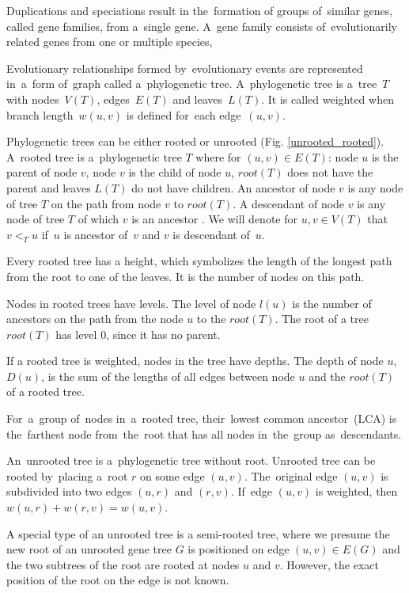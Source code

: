 Duplications and speciations result in the~formation of groups of~similar genes, called gene families, from a~single gene. A~gene family consists of~evolutionarily related genes from one or multiple species, 

Evolutionary relationships formed by~evolutionary events are represented in~a~form of~graph called a~phylogenetic tree. A~phylogenetic tree is a~tree~$T$ with nodes~$V(T)$, edges~$E(T)$ and leaves~$L(T)$. It is called weighted when branch length~$w(u, v)$ is defined for~each edge~$(u, v)$.

Phylogenetic trees can be either rooted or unrooted (Fig. \ref{unrooted_rooted}). A~rooted tree is a~phylogenetic tree $T$ where for $(u, v) \in E(T)$: node $u$ is the parent of node $v$, node $v$ is the child of node $u$, $root(T)$ does not have the parent and leaves $L(T)$ do not have children. An ancestor of node $v$ is any node of tree $T$ on the path from node $v$ to $root(T)$. A descendant of node $v$ is any node of tree $T$ of which $v$ is an ancestor \cite{hasic}. We will denote for $u, v \in V(T)$ that $v<_Tu$ if~$u$ is ancestor of~$v$ and $v$ is descendant of~$u$.

Every rooted tree has a height, which symbolizes the length of the longest path from the root to one of the leaves. It is the number of nodes on this path. 

Nodes in rooted trees have levels. The level of node $l(u)$ is the number of ancestors on the path from the node $u$ to the $root(T)$. The root of a tree $root(T)$ has level 0, since it has no parent.

If a rooted tree is weighted, nodes in the tree have depths. The depth of node $u$, $D(u)$, is the sum of the lengths of all edges between node $u$ and the $root(T)$ of a rooted tree.

For~a~group of~nodes in~a~rooted tree, their~lowest common ancestor~(LCA) is the~farthest node from~the~root that has all nodes in~the~group as~descendants.

An~unrooted tree is a~phylogenetic tree without root. Unrooted tree can be rooted by~placing a~root $r$ on some edge $(u, v)$. The~original edge $(u, v)$ is subdivided into two edges $(u, r)$ and $(r, v)$. If~edge $(u, v)$ is weighted, then $w(u, r) + w(r, v) = w(u, v)$.

A special type of an unrooted tree is a semi-rooted tree, where we presume the new root of an unrooted gene tree $G$ is positioned on edge $(u, v) \in E(G)$ and the two subtrees of the root are rooted at nodes $u$ and $v$. However, the exact position of the root on the edge is not known.

